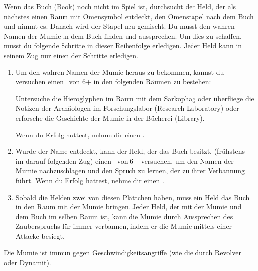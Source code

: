   \begin{itemize}
        \bitem Wenn das Buch (Book) noch nicht im Spiel ist, durchsucht der Held, der als nächstes einen Raum mit Omensymbol entdeckt, den Omenstapel nach dem Buch und nimmt es. Danach wird der Stapel neu gemischt.
        \bitem Du musst den wahren Namen der Mumie in dem Buch finden und aussprechen. Um dies zu schaffen, musst du folgende Schritte in dieser Reihenfolge erledigen. Jeder Held kann in seinem Zug nur einen der Schritte erledigen.

\newpage
        \begin{enumerate}
            \item Um den wahren Namen der Mumie heraus zu bekommen, kannst du versuchen einen \knowroll\ von 6+ in den folgenden Räumen zu bestehen:

            \begin{itemize}
                \bitem Untersuche die Hieroglyphen im Raum mit dem Sarkophag oder
                \bitem überfliege die Notizen der Archäologen im Forschungslabor (Research Laboratory) oder
                \bitem erforsche die Geschichte der Mumie in der Bücherei (Library).
            \end{itemize}
            Wenn du Erfolg hattest, nehme dir einen .

            \item Wurde der Name entdeckt, kann der Held, der das Buch besitzt, (frühstens im darauf folgenden Zug) einen \knowroll\ von 6+ versuchen, um den Namen der Mumie nachzuschlagen und den Spruch zu lernen, der zu ihrer Verbannung führt. Wenn du Erfolg hattest, nehme dir einen .


            \item Sobald die Helden zwei von diesen Plättchen haben, muss ein Held das Buch in den Raum mit der Mumie bringen. Jeder Held, der mit der Mumie und dem Buch im selben Raum ist, kann die Mumie durch Aussprechen des Zauberspruchs für immer verbannen, indem er die Mumie mittels einer \sanity-Attacke besiegt.
        \end{enumerate}

    \bitem Die Mumie ist immun gegen Geschwindigkeitsangriffe (wie die durch Revolver oder Dynamit).

    \end{itemize}


